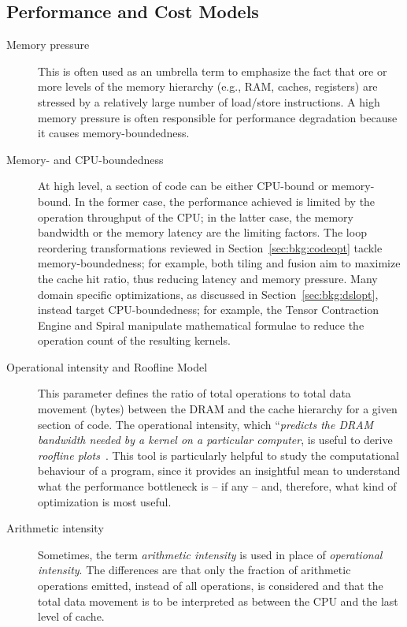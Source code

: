\subsection*{Performance and Cost Models}
\begin{description}

\item[Memory pressure] This is often used as an umbrella term to emphasize the fact that ore or more levels of the memory hierarchy (e.g., RAM, caches, registers) are stressed by a relatively large number of load/store instructions. A high memory pressure is often responsible for performance degradation because it causes memory-boundedness.

\item[Memory- and CPU-boundedness] At high level, a section of code can be either CPU-bound or memory-bound. In the former case, the performance achieved is limited by the operation throughput of the CPU; in the latter case, the memory bandwidth or the memory latency are the limiting factors. The loop reordering transformations reviewed in Section~\ref{sec:bkg:codeopt} tackle memory-boundedness; for example, both tiling and fusion aim to maximize the cache hit ratio, thus reducing latency and memory pressure. Many domain specific optimizations, as discussed in Section~\ref{sec:bkg:dslopt}, instead target CPU-boundedness; for example, the Tensor Contraction Engine and Spiral manipulate mathematical formulae to reduce the operation count of the resulting kernels.

\item[Operational intensity and Roofline Model] This parameter defines the ratio of total operations to total data movement (bytes) between the DRAM and the cache hierarchy for a given section of code. The operational intensity, which ``{\it predicts the DRAM bandwidth needed by a kernel on a particular computer}, is useful to derive {\em roofline plots}~\cite{roofline-cite}. This tool is particularly helpful to study the computational behaviour of a program, since it provides an insightful mean to understand what the performance bottleneck is -- if any -- and, therefore, what kind of optimization is most useful. 

\item[Arithmetic intensity] Sometimes, the term {\em arithmetic intensity} is used in place of {\em operational intensity}. The differences are that only the fraction of arithmetic operations emitted, instead of all operations, is considered and that the total data movement is to be interpreted as between the CPU and the last level of cache.
\end{description}

